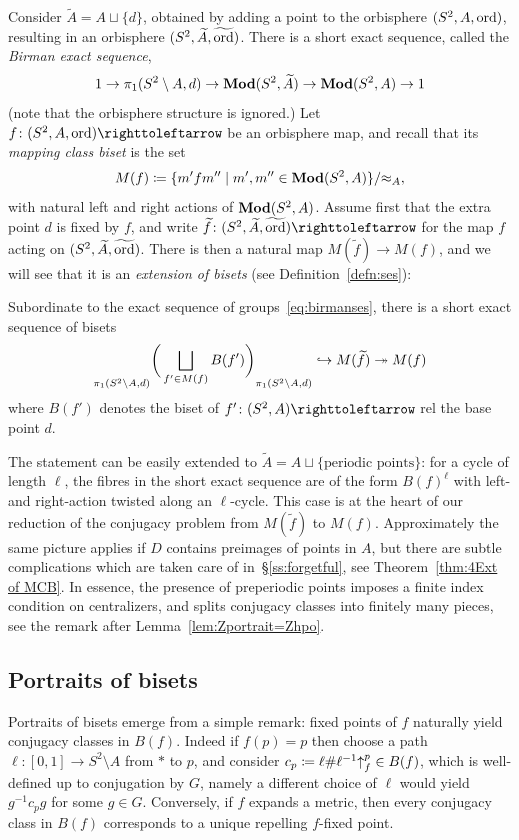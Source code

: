 \documentclass{amsart}
\newcommand\wtf{{\widetilde f}}
\newcommand\wtA{{\widetilde A}}
\newcommand\wtord{{\widetilde\ord}}
\begin{document}
Consider $\wtA=A\sqcup\{d\}$, obtained by adding a point to
the orbisphere $(S^2,A,\operatorname{ord})$, resulting in an orbisphere
$(S^2,\wtA,\wtord)$. There is a short exact sequence,
called the \emph{Birman exact sequence},
\begin{equation}\label{eq:birmanses}
  1\to\pi_1(S^2\setminus A,d)\to\Mod(S^2,\wtA)\to\Mod(S^2,A)\to1
\end{equation}
(note that the orbisphere structure is ignored.) Let
$f\colon(S^2,A,\ord)\selfmap$ be an orbisphere map, and recall that its
\emph{mapping class biset} is the set
\[M(f)\coloneqq\{m' f m''\mid m',m''\in\mathbf{\relax Mod}(S^2,A)\}/{\approx_A},
\]
with natural left and right actions of $\mathbf{\relax Mod}(S^2,A)$. Assume first
that the extra point $d$ is fixed by $f$, and write
$\wtf\colon(S^2,\wtA,\wtord)\selfmap$ for the map $f$ acting
on $(S^2,\wtA,\wtord)$.  There is then a natural map
$M(\wtf)\to M(f)$, and we will see that it is an \emph{extension of
  bisets} (see Definition~\ref{defn:ses}):
\begin{mainthm}[= Corollary~\ref{cor:thm:extension}]\label{mainthm:extension}
  Subordinate to the exact sequence of groups~\eqref{eq:birmanses},
  there is a short exact sequence of bisets
  \[\subscript{\pi_1(S^2\setminus A,d)}{\bigg(\bigsqcup_{f'\in M(f)}B(f')\bigg)}_{\pi_1(S^2\setminus A,d)}\hookrightarrow M(\wtf)\twoheadrightarrow M(f)
  \]
  where $B(f')$ denotes the biset of $f'\colon (S^2,A)\selfmap$ rel
  the base point $d$.
\end{mainthm}

The statement can be easily extended to
$\wtA=A\sqcup\{\text{periodic points}\}$: for a cycle of length
$\ell$, the fibres in the short exact sequence are of the form
$B(f)^\ell$ with left- and right-action twisted along an
$\ell$-cycle. This case is at the heart of our reduction of the
conjugacy problem from $M(\wtf)$ to $M(f)$. Approximately the same
picture applies if $D$ contains preimages of points in $A$, but there
are subtle complications which are taken care of
in~\S\ref{ss:forgetful}, see Theorem~\ref{thm:4Ext of MCB}. In
essence, the presence of preperiodic points imposes a finite index
condition on centralizers, and splits conjugacy classes into finitely
many pieces, see the remark after Lemma~\ref{lem:Zportrait=Zhpo}.

\subsection{Portraits of bisets}
Portraits of bisets emerge from a simple remark: fixed points of $f$
naturally yield conjugacy classes in $B(f)$. Indeed if $f(p)=p$ then
choose a path $\ell\colon[0,1]\to S^2\setminus A$ from $*$ to $p$, and
consider $c_p\coloneqq\ell\#\ell^{-1}{\uparrow}_{f}^{p}\in B(f)$, which is
well-defined up to conjugation by $G$, namely a different choice of
$\ell$ would yield $g^{-1}c_p g$ for some $g\in G$. Conversely, if $f$
expands a metric, then every conjugacy class in $B(f)$ corresponds to
a unique repelling $f$-fixed point.
\end{document}

